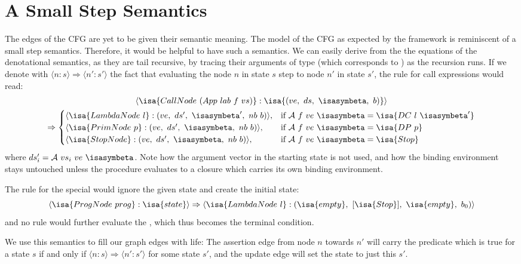 \documentclass[a4paper,halfparskip,DIV=10,11pt]{scrbook}
\newcommand{\A}{\mathcal A}
\begin{document}
\section{A Small Step Semantics}

The edges of the CFG are yet to be given their semantic meaning. The model of the CFG as expected by the framework is reminiscent of a small step semantics. Therefore, it would be helpful to have such a semantics. We can easily derive from the the equations of the denotational semantics, as they are tail recursive, by tracing their arguments of type  (which corresponds to ) as the recursion runs. If we denote with $\langle n:s\rangle \Rightarrow \langle n':s'\rangle$ the fact that evaluating the node $n$ in state $s$ step to node $n'$ in state $s'$, the rule for call expressions would read:
\begin{multline*}
\langle \isa{CallNode\ (App\ lab\ f\ vs)} : \isa{(ve,\ ds,\ \isasymbeta,\ b)}\rangle \\ \Rightarrow 
\begin{cases}
\langle \isa{LambdaNode\ l} : (ve,\ ds',\ \isasymbeta',\ nb\ b) \rangle, & \text{if } \A\ f\ ve\ \isasymbeta = \isa{DC\ l\ \isasymbeta'} \\
\langle \isa{PrimNode\ p} : (ve,\ ds',\ \isasymbeta,\ nb\ b) \rangle, & \text{if } \A\ f\ ve\ \isasymbeta = \isa{DP\ p} \\
\langle \isa{StopNode} : (ve,\ ds',\ \isasymbeta,\ nb\ b) \rangle, & \text{if } \A\ f\ ve\ \isasymbeta = \isa{Stop} 
\end{cases}
\end{multline*}
where $ds'_i = \A\ vs_i\ ve\ \isasymbeta$. Note how the argument vector  in the starting state is not used, and how the binding environment stays untouched unless the procedure  evaluates to a closure which carries its own binding environment.

The rule for the special  would ignore the given state and create the initial state: 
\[
\langle \isa{ProgNode\ prog} : \isa{state}\rangle \Rightarrow 
\langle \isa{LambdaNode\ l} : (\isa{empty},\ [\isa{Stop}],\ \isa{empty},\ b_0)\rangle
\]
and no rule would further evaluate the , which thus becomes the terminal condition.

We use this semantics to fill our graph edges with life: The assertion edge from node $n$ towards $n'$ will carry the predicate which is true for a state $s$ if and only if $\langle n:s\rangle \Rightarrow \langle n':s'\rangle$ for some state $s'$, and the update edge will set the state to just this $s'$.
\end{document}
